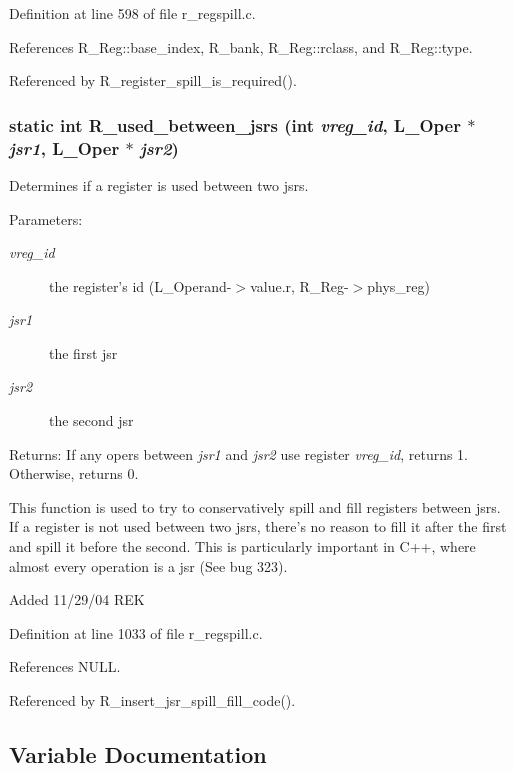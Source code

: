 Definition at line 598 of file r\_\-regspill.c.

References R\_\-Reg::base\_\-index, R\_\-bank, R\_\-Reg::rclass, and R\_\-Reg::type.

Referenced by R\_\-register\_\-spill\_\-is\_\-required().
\subsubsection{\setlength{\rightskip}{0pt plus 5cm}static int R\_\-used\_\-between\_\-jsrs (int {\em vreg\_\-id}, L\_\-Oper $\ast$ {\em jsr1}, L\_\-Oper $\ast$ {\em jsr2})\hspace{0.3cm}{\tt  [static]}}\label{r__regspill_8c_04d0b4aee0f4b904ef7eb3b713134bc4}


Determines if a register is used between two jsrs. 

\begin{Desc}
\item[Parameters:]
\begin{description}
\item[{\em vreg\_\-id}]the register's id (L\_\-Operand-$>$value.r, R\_\-Reg-$>$phys\_\-reg) \item[{\em jsr1}]the first jsr \item[{\em jsr2}]the second jsr\end{description}
\end{Desc}
\begin{Desc}
\item[Returns:]If any opers between {\em jsr1\/} and {\em jsr2\/} use register {\em vreg\_\-id\/}, returns 1. Otherwise, returns 0.\end{Desc}
This function is used to try to conservatively spill and fill registers between jsrs. If a register is not used between two jsrs, there's no reason to fill it after the first and spill it before the second. This is particularly important in C++, where almost every operation is a jsr (See bug 323).

Added 11/29/04 REK 

Definition at line 1033 of file r\_\-regspill.c.

References NULL.

Referenced by R\_\-insert\_\-jsr\_\-spill\_\-fill\_\-code().

\subsection{Variable Documentation}
